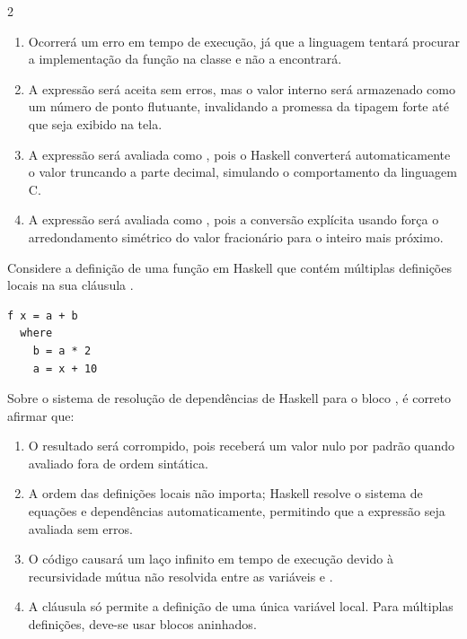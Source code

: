 \documentclass[a4paper,10pt,brazil]{article}
\begin{document}
\begin{multicols}{2}
\begin{enumerate}
  \item Ocorrerá um erro em tempo de execução, já que a linguagem tentará procurar a implementação da função  na classe  e não a encontrará.

  \item A expressão será aceita sem erros, mas o valor interno será armazenado como um número de ponto flutuante, invalidando a promessa da tipagem forte até que seja exibido na tela.

  \item A expressão será avaliada como , pois o Haskell converterá automaticamente o valor truncando a parte decimal, simulando o comportamento da linguagem C.

  \item A expressão será avaliada como , pois a conversão explícita usando \haskellinline{::} força o arredondamento simétrico do valor fracionário para o inteiro mais próximo.


\end{enumerate}

Considere a definição de uma função  em Haskell que contém múltiplas definições locais na sua cláusula . 
\begin{verbatim}
f x = a + b
  where
    b = a * 2
    a = x + 10
\end{verbatim}
Sobre o sistema de resolução de dependências de Haskell para o bloco , é correto afirmar que:

\begin{enumerate}
  \item O resultado será corrompido, pois  receberá um valor nulo por padrão quando avaliado fora de ordem sintática.

  \item A ordem das definições locais não importa; Haskell resolve o sistema de equações e dependências automaticamente, permitindo que a expressão seja avaliada sem erros.

  \item O código causará um laço infinito em tempo de execução devido à recursividade mútua não resolvida entre as variáveis  e .

  \item A cláusula  só permite a definição de uma única variável local. Para múltiplas definições, deve-se usar blocos  aninhados.


\end{enumerate}
\end{multicols}
\end{document}
